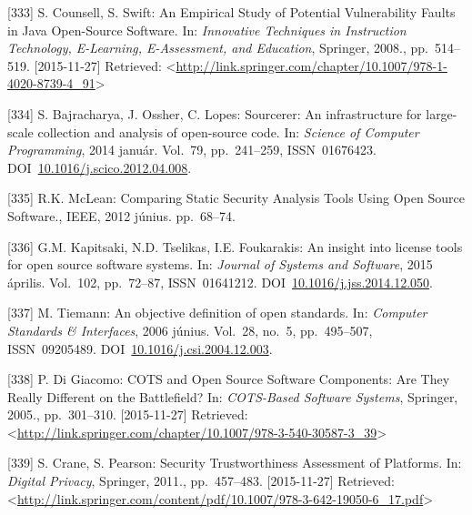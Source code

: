 \documentclass[12pt,magyar,a4paper,oneside]{scrreprt}
\newenvironment{cslreferences}%
  {}%
  {\par}
\begin{document}
\begin{cslreferences}
\leavevmode\hypertarget{ref-counsell_empirical_2008}{}%
{[}333{]} S. Counsell, S. Swift: An Empirical Study of Potential
Vulnerability Faults in Java Open-Source Software. In: \emph{Innovative
Techniques in Instruction Technology, E-Learning, E-Assessment, and
Education}, Springer, 2008., pp.~514--519. {[}2015-11-27{]} Retrieved:
\textless{}\url{http://link.springer.com/chapter/10.1007/978-1-4020-8739-4_91}\textgreater{}

\leavevmode\hypertarget{ref-bajracharya_sourcerer_2014}{}%
{[}334{]} S. Bajracharya, J. Ossher, C. Lopes: Sourcerer: An
infrastructure for large-scale collection and analysis of open-source
code. In: \emph{Science of Computer Programming}, 2014 január. Vol.~79,
pp.~241--259, ISSN~01676423.
DOI~\href{https://doi.org/10.1016/j.scico.2012.04.008}{10.1016/j.scico.2012.04.008}.

\leavevmode\hypertarget{ref-mclean_comparing_2012}{}%
{[}335{]} R.K. McLean: Comparing Static Security Analysis Tools Using
Open Source Software., IEEE, 2012 június. pp.~68--74.

\leavevmode\hypertarget{ref-kapitsaki_insight_2015}{}%
{[}336{]} G.M. Kapitsaki, N.D. Tselikas, I.E. Foukarakis: An insight
into license tools for open source software systems. In: \emph{Journal
of Systems and Software}, 2015 április. Vol.~102, pp.~72--87,
ISSN~01641212.
DOI~\href{https://doi.org/10.1016/j.jss.2014.12.050}{10.1016/j.jss.2014.12.050}.

\leavevmode\hypertarget{ref-tiemann_objective_2006}{}%
{[}337{]} M. Tiemann: An objective definition of open standards. In:
\emph{Computer Standards \& Interfaces}, 2006 június. Vol.~28, no.~5,
pp.~495--507, ISSN~09205489.
DOI~\href{https://doi.org/10.1016/j.csi.2004.12.003}{10.1016/j.csi.2004.12.003}.

\leavevmode\hypertarget{ref-di_giacomo_cots_2005}{}%
{[}338{]} P. Di Giacomo: COTS and Open Source Software Components: Are
They Really Different on the Battlefield? In: \emph{COTS-Based Software
Systems}, Springer, 2005., pp.~301--310. {[}2015-11-27{]} Retrieved:
\textless{}\url{http://link.springer.com/chapter/10.1007/978-3-540-30587-3_39}\textgreater{}

\leavevmode\hypertarget{ref-crane_security_2011}{}%
{[}339{]} S. Crane, S. Pearson: Security Trustworthiness Assessment of
Platforms. In: \emph{Digital Privacy}, Springer, 2011., pp.~457--483.
{[}2015-11-27{]} Retrieved:
\textless{}\url{http://link.springer.com/content/pdf/10.1007/978-3-642-19050-6_17.pdf}\textgreater{}


\end{cslreferences}
\end{document}
